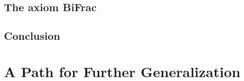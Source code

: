 \documentclass{article}
\numberwithin{equation}{section}
\theoremstyle{definition}
\theoremstyle{plain}
\begin{document}
\newpage

\subsection{The axiom \textbf{BiFrac}}

\subsection{Conclusion}

\newpage
\section{A Path for Further Generalization}


\newpage


	
\end{document}
